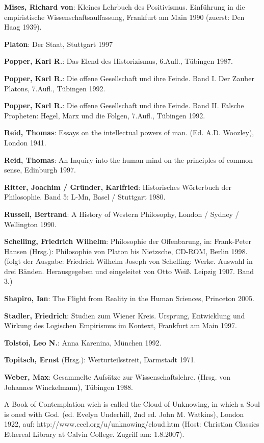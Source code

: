 {\bf Mises, Richard von}: Kleines Lehrbuch des Positivismus. Einführung in die
empiristische Wissenschaftsauf\/fassung, Frankfurt am Main 1990 (zuerst: Den
Haag 1939).

{\bf Platon}: Der Staat, Stuttgart 1997

{\bf Popper, Karl R.}: Das Elend des Historizismus, 6.Aufl., Tübingen 1987.

{\bf Popper, Karl R.}: Die offene Gesellschaft und ihre Feinde. Band I. Der
Zauber Platons, 7.Aufl., Tübingen 1992.

{\bf Popper, Karl R.}: Die offene Gesellschaft und ihre Feinde. Band II.
Falsche Propheten: Hegel, Marx und die Folgen, 7.Aufl., Tübingen 1992.

{\bf Reid, Thomas}: Essays on the intellectual powers of
man. (Ed. A.D. Woozley), London 1941.

{\bf Reid, Thomas}: An Inquiry into the human mind on the principles of common
sense, Edinburgh 1997. 

{\bf Ritter, Joachim / Gründer, Karlfried}: Historisches Wörterbuch der
Philosophie. Band 5: L-Mn, Basel / Stuttgart 1980.

{\bf Russell, Bertrand}: A History of Western Philosophy, London / Sydney /
Wellington 1990.

{\bf Schelling, Friedrich Wilhelm}: Philosophie der Offenbarung, in:
Frank-Peter Hansen (Hrsg.): Philosophie von Platon bis Nietzsche, CD-ROM,
Berlin 1998. (folgt der Ausgabe: Friedrich Wilhelm Joseph von Schelling:
Werke. Auswahl in drei Bänden. Herausgegeben und eingeleitet von Otto Weiß.
Leipzig 1907. Band 3.)

{\bf Shapiro, Ian}: The Flight from Reality in the Human Sciences, Princeton
2005.

{\bf Stadler, Friedrich}: Studien zum Wiener Kreis. Ursprung, Entwicklung und
Wirkung des Logischen Empirismus im Kontext, Frankfurt am Main 1997.

{\bf Tolstoi, Leo N.}: Anna Karenina, München 1992.

{\bf Topitsch, Ernst} (Hrsg.): Werturteilsstreit, Darmstadt 1971.

{\bf Weber, Max}: Gesammelte Aufsätze zur Wissenschaftslehre. (Hrsg. von
Johannes Winckelmann), Tübingen 1988. 

A Book of Contemplation wich is called the Cloud of Unknowing, in which a Soul
is oned with God. (ed. Evelyn Underhill, 2nd ed.  John M. Watkins), London
1922, auf: http://www.ccel.org/u/unknowing/cloud.htm (Host: Christian Classics
Ethereal Library at Calvin College. Zugriff am: 1.8.2007).




